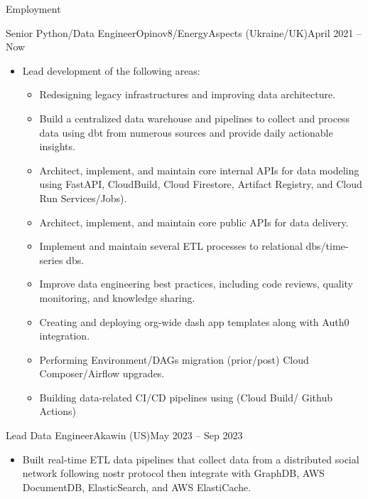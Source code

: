 \documentclass[]{ahmedamrcv}
\begin{document}
	\makeheader
	
	\begin{cvsection}{Employment}
		\begin{cvsubsection}{Senior Python/Data Engineer}{Opinov8/EnergyAspects (Ukraine/UK)}{April 2021 -- Now}
			\begin{itemize}
				\item Lead development of the following areas:
				\begin{itemize}
					\item Redesigning legacy infrastructures and improving data architecture.
					\item Build a centralized data warehouse and pipelines to collect and process data using dbt from numerous sources and provide daily actionable insights.
					\item Architect, implement, and maintain core internal APIs for data modeling using FastAPI, CloudBuild, Cloud Firestore, Artifact Registry, and Cloud Run Services/Jobs).
					\item Architect, implement, and maintain core public APIs for data delivery.
					\item Implement and maintain several ETL processes to relational dbs/time-series dbs.
					\item Improve data engineering best practices, including code reviews, quality monitoring, and knowledge sharing.
					\item Creating and deploying org-wide dash app templates along with Auth0 integration.
					\item Performing Environment/DAGs migration (prior/post) Cloud Composer/Airflow upgrades.
					\item Building data-related CI/CD pipelines using (Cloud Build/ Github Actions)
				\end{itemize}
			\end{itemize}
		\end{cvsubsection}

		\begin{cvsubsection}{Lead Data Engineer}{Akawin (US)}{May 2023 -- Sep 2023}
			\begin{itemize}
				\item Built real-time ETL data pipelines that collect data from a distributed social network following nostr protocol then integrate with GraphDB, AWS DocumentDB, ElasticSearch, and AWS ElastiCache.
			\end{itemize}
		\end{cvsubsection}


\end{cvsection}
\end{document}
